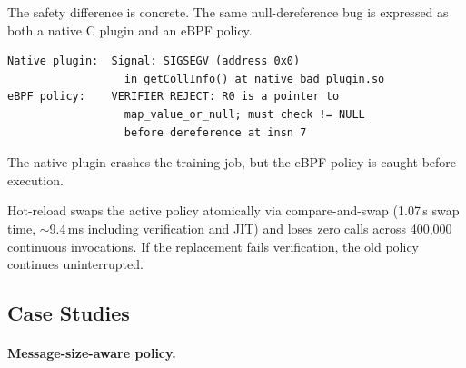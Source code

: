 \documentclass[sigplan,10pt]{acmart}
\newcommand{\us}{\,\textmu{}s\xspace}
\begin{document}
The safety difference is concrete. The same
null-dereference bug is expressed as both a native C plugin and an eBPF policy.

\begin{lstlisting}[basicstyle=\ttfamily\scriptsize,numbers=none,frame=none,xleftmargin=1em]
Native plugin:  Signal: SIGSEGV (address 0x0)
                  in getCollInfo() at native_bad_plugin.so
eBPF policy:    VERIFIER REJECT: R0 is a pointer to
                  map_value_or_null; must check != NULL
                  before dereference at insn 7
\end{lstlisting}

\noindent The native plugin crashes the training job, but the eBPF policy
is caught before execution.

Hot-reload swaps the active policy atomically via compare-and-swap
(1.07\us swap time, $\sim$9.4\,ms including verification and JIT)
and loses zero calls across 400{,}000 continuous invocations.
If the replacement fails verification, the old policy continues
uninterrupted.

\subsection{Case Studies}
\label{sec:eval-casestudies}

\paragraph{Message-size-aware policy.}
\end{document}
